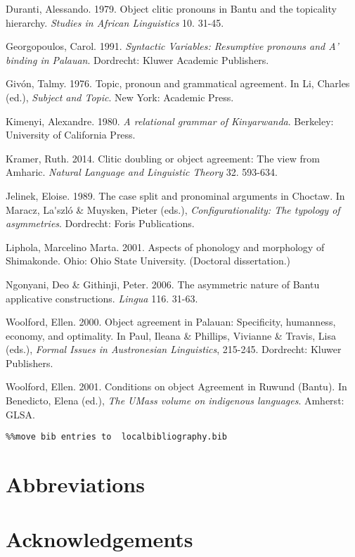 \documentclass[output=paper]{langsci/langscibook}
\begin{document}
Duranti, Alessando. 1979. Object clitic pronouns in Bantu and the topicality hierarchy. {\textit{Studies in African Linguistics}} 10. 31-45.

Georgopoulos, Carol. 1991. {\textit{Syntactic Variables: Resumptive pronouns and A' binding in Palauan}}. Dordrecht: Kluwer Academic Publishers.

Givón, Talmy. 1976. Topic, pronoun and grammatical agreement. In Li, Charles (ed.), {\textit{Subject and Topic}}. New York: Academic Press.

Kimenyi, Alexandre. 1980. {\textit{A relational grammar of Kinyarwanda}}. Berkeley: University of California Press.

Kramer, Ruth. 2014. Clitic doubling or object agreement: The view from Amharic. {\textit{Natural Language and Linguistic Theory}} 32. 593-634.

Jelinek, Eloise. 1989. The case split and pronominal arguments in Choctaw. In Maracz, La\' {}szló \& Muysken, Pieter (eds.), {\textit{Configurationality: The typology of asymmetries}}. Dordrecht: Foris Publications.

Liphola, Marcelino Marta. 2001. Aspects of phonology and morphology of Shimakonde. Ohio: Ohio State University. (Doctoral dissertation.)

Ngonyani, Deo \& Githinji, Peter. 2006. The asymmetric nature of Bantu applicative constructions. {\textit{Lingua }}116. 31-63.

Woolford, Ellen. 2000. Object agreement in Palauan: Specificity, humanness, economy, and optimality. In Paul, Ileana \& Phillips, Vivianne \& Travis, Lisa (eds.), {\textit{Formal Issues in Austronesian Linguistics}}, 215-245. Dordrecht: Kluwer Publishers.

Woolford, Ellen. 2001. Conditions on object Agreement in Ruwund (Bantu). In Benedicto, Elena (ed.), {\textit{The UMass volume on indigenous languages}}. Amherst: GLSA.


\begin{verbatim}%%move bib entries to  localbibliography.bib
\end{verbatim}

\section*{Abbreviations}
\section*{Acknowledgements}

\printbibliography[heading=subbibliography,notkeyword=this]
\end{document}
